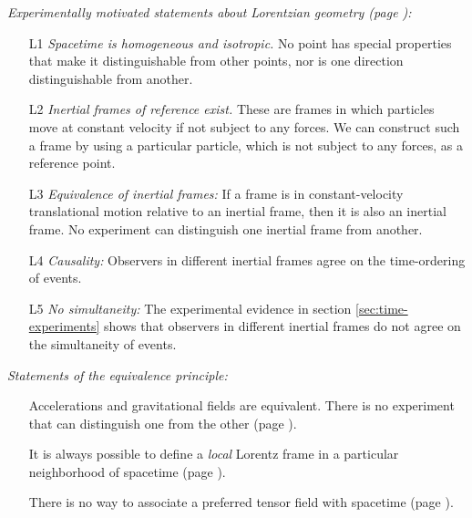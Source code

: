 \documentclass{genrel}
\begin{document}
\emph{Experimentally motivated statements about Lorentzian geometry (page \pageref{lorentz-geometry-postulates}):}\\\label{lorentz-summary}
\begin{itemize}\label{lorentz-geometry-postulates}
\item[L1] \emph{Spacetime is homogeneous and isotropic.} No point has special properties that make it distinguishable from other points, nor is one
                  direction distinguishable from another.
\item[L2] \emph{Inertial frames of reference exist.} These are frames in which particles move at constant velocity if not subject to any forces.
                  We can construct such a frame by using a particular particle, which is not subject to any forces, as a reference point.
\item[L3] \emph{Equivalence of inertial frames:} If a frame is in constant-velocity translational motion relative to an inertial frame, then it is also an inertial frame.
              No experiment can distinguish one inertial frame from another.
\item[L4] \emph{Causality:} Observers in different inertial frames agree on the time-ordering of events.
\item[L5] \emph{No simultaneity:} The experimental evidence in section \ref{sec:time-experiments} shows that
           observers in different inertial frames do not agree on the simultaneity of events.
\end{itemize}

\emph{Statements of the equivalence principle:}\\\label{equivalence-principle-summary}
\begin{itemize}
\item[] Accelerations and gravitational fields are equivalent. There is no experiment that can distinguish one from
the other (page \pageref{equivalence-a-and-g}).
\item[] It is always possible to define a \emph{local} Lorentz
frame in a particular neighborhood of spacetime (page \pageref{equivalence-locally-lorentzian}).
\item[] There is no way to associate a preferred tensor field with spacetime (page \pageref{equivalence-no-preferred-field}).
\end{itemize}
\end{document}
